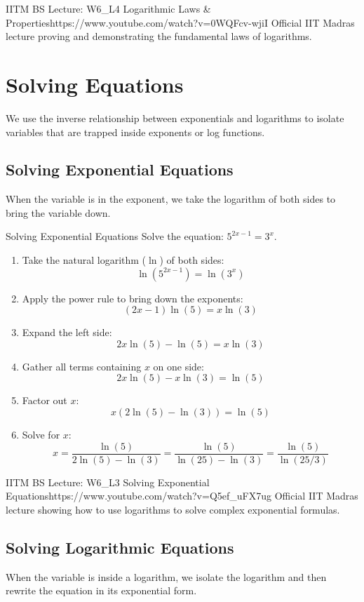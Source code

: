 \begin{videocard}{IITM BS Lecture: W6\_L4 Logarithmic Laws \& Properties}{https://www.youtube.com/watch?v=0WQFcv-wjiI}
Official IIT Madras lecture proving and demonstrating the fundamental laws of logarithms.
\end{videocard}

\section{Solving Equations}

We use the inverse relationship between exponentials and logarithms to isolate variables that are trapped inside exponents or log functions.

\subsection{Solving Exponential Equations}
When the variable is in the exponent, we take the logarithm of both sides to bring the variable down.

\begin{examplebox}{Solving Exponential Equations}
Solve the equation: $5^{2x-1} = 3^x$.
\begin{enumerate}
    \item Take the natural logarithm ($\ln$) of both sides:
    $$\ln(5^{2x-1}) = \ln(3^x)$$
    \item Apply the power rule to bring down the exponents:
    $$(2x - 1)\ln(5) = x\ln(3)$$
    \item Expand the left side:
    $$2x\ln(5) - \ln(5) = x\ln(3)$$
    \item Gather all terms containing $x$ on one side:
    $$2x\ln(5) - x\ln(3) = \ln(5)$$
    \item Factor out $x$:
    $$x(2\ln(5) - \ln(3)) = \ln(5)$$
    \item Solve for $x$:
    $$x = \frac{\ln(5)}{2\ln(5) - \ln(3)} = \frac{\ln(5)}{\ln(25) - \ln(3)} = \frac{\ln(5)}{\ln(25/3)}$$
\end{enumerate}
\end{examplebox}

\begin{videocard}{IITM BS Lecture: W6\_L3 Solving Exponential Equations}{https://www.youtube.com/watch?v=Q5ef_uFX7ug}
Official IIT Madras lecture showing how to use logarithms to solve complex exponential formulas.
\end{videocard}

\subsection{Solving Logarithmic Equations}
When the variable is inside a logarithm, we isolate the logarithm and then rewrite the equation in its exponential form.

